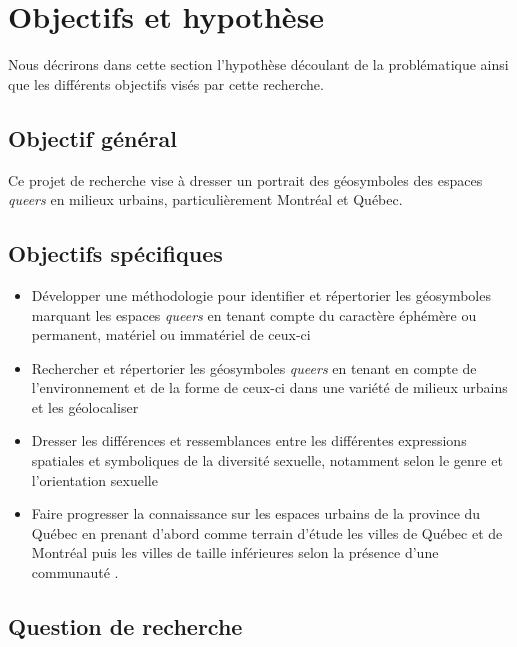 \section*{Objectifs et hypothèse} %
\label{sec:objectifs_et_hypotheses}
Nous décrirons dans cette section l'hypothèse découlant de la problématique ainsi que les différents objectifs visés par cette recherche.


\subsection*{Objectif général} %
\label{sub:objectif_general}
Ce projet de recherche vise à dresser un portrait des géosymboles des espaces \emph{queers} en milieux urbains, particulièrement Montréal et Québec.

\subsection*{Objectifs spécifiques} %
\label{sub:objectifs_specifiques}

\begin{itemize}
	\item Développer une méthodologie pour identifier et répertorier les géosymboles marquant les espaces \emph{queers} en tenant compte du caractère éphémère ou permanent, matériel ou immatériel de ceux-ci \;
	\item Rechercher et répertorier les géosymboles \emph{queers} en tenant en compte de l'environnement et de la forme de ceux-ci dans une variété de milieux urbains et les géolocaliser \;
	\item Dresser les différences et ressemblances entre les différentes expressions spatiales et symboliques de la diversité sexuelle, notamment selon le genre et l'orientation sexuelle \;
  \item Faire progresser la connaissance sur les espaces \lgbt{} urbains de la province du Québec en prenant d'abord comme terrain d'étude les villes de Québec et de Montréal puis les villes de taille inférieures selon la présence d'une communauté \lgbt.
\end{itemize}


\subsection*{Question de recherche} %
\label{sub:hypothese}


